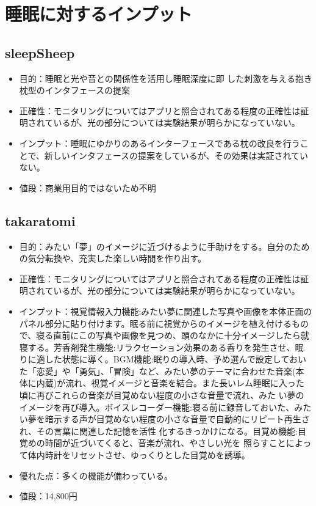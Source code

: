 \section{睡眠に対するインプット}

\subsection{sleepSheep}
\begin{itemize}
\item 目的：睡眠と光や音との関係性を活用し睡眠深度に即 した刺激を与える抱き枕型のインタフェースの提案 \cite{sleepSheep}
\item 正確性：モニタリングについてはアプリと照合されてある程度の正確性は証明されているが、光の部分については実験結果が明らかになっていない。
\item インプット：睡眠にゆかりのあるインターフェースである枕の改良を行うことで、新しいインタフェースの提案をしているが、その効果は実証されていない。
\item 値段：商業用目的ではないため不明
\end{itemize}


\subsection{takaratomi}
\begin{itemize}
\item 目的：みたい「夢」のイメージに近づけるように手助けをする。自分のための気分転換や、充実した楽しい時間を作り出す。 \cite{takaratomi}
\item 正確性：モニタリングについてはアプリと照合されてある程度の正確性は証明されているが、光の部分については実験結果が明らかになっていない。
\item インプット：視覚情報入力機能:みたい夢に関連した写真や画像を本体正面のパネル部分に貼り付けます。眠る前に視覚からのイメージを植え付けるもので、寝る直前にこの写真や画像を見つめ、頭のなかに十分イメージしたら就寝する。芳香剤発生機能:リラクセーション効果のある香りを発生させ、眠 りに適した状態に導く。BGM機能:眠りの導入時、予め選んで設定しておいた「恋愛」や「勇気」、「冒険」など、みたい夢のテーマに合わせた音楽(本体に内蔵)が流れ、視覚イメージと音楽を結合。また長いレム睡眠に入った頃に再びこれらの音楽が目覚めない程度の小さな音量で流れ、みた い夢のイメージを再び導入。ボイスレコーダー機能:寝る前に録音しておいた、みたい夢を暗示する声が目覚めない程度の小さな音量で自動的にリピート再生され、その言葉に関連した記憶を活性 化するきっかけになる。目覚め機能:目覚めの時間が近づいてくると、音楽が流れ、やさしい光を 照らすことによって体内時計をリセットさせ、ゆっくりとした目覚めを誘導。
\item 優れた点：多くの機能が備わっている。
\item 値段：14,800円
\end{itemize}


